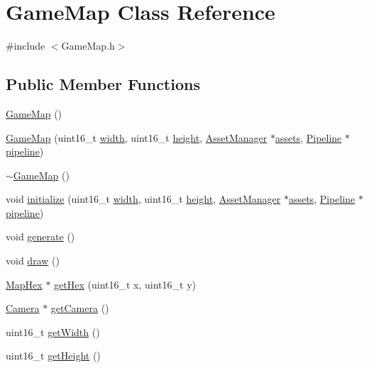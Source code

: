 \hypertarget{class_game_map}{}\section{Game\+Map Class Reference}
\label{class_game_map}


{\ttfamily \#include $<$Game\+Map.\+h$>$}

\subsection*{Public Member Functions}
\begin{DoxyCompactItemize}
\item 
\hyperlink{class_game_map_aae71e5694cf19612fcaa4c1e21b03b71}{Game\+Map} ()
\item 
\hyperlink{class_game_map_a4b0e78c26fc61ce3e8db947f37828a02}{Game\+Map} (uint16\+\_\+t \hyperlink{class_game_map_a827aedef06be5c3115eeea3ac8e68b72}{width}, uint16\+\_\+t \hyperlink{class_game_map_a37c9c83ab73f37508753f45cbc9594d5}{height}, \hyperlink{class_asset_manager}{Asset\+Manager} $\ast$\hyperlink{class_game_map_af63a6638804af038977a55f6e4d6d6bd}{assets}, \hyperlink{class_pipeline}{Pipeline} $\ast$\hyperlink{class_game_map_a0fd10cff6ef3c8b1b96eb7f3cabc8946}{pipeline})
\item 
\hyperlink{class_game_map_a85d51ef20c2d27f11c739ff02d5717c3}{$\sim$\+Game\+Map} ()
\item 
void \hyperlink{class_game_map_ad45871c8fe5b4de49862b433a787976f}{initialize} (uint16\+\_\+t \hyperlink{class_game_map_a827aedef06be5c3115eeea3ac8e68b72}{width}, uint16\+\_\+t \hyperlink{class_game_map_a37c9c83ab73f37508753f45cbc9594d5}{height}, \hyperlink{class_asset_manager}{Asset\+Manager} $\ast$\hyperlink{class_game_map_af63a6638804af038977a55f6e4d6d6bd}{assets}, \hyperlink{class_pipeline}{Pipeline} $\ast$\hyperlink{class_game_map_a0fd10cff6ef3c8b1b96eb7f3cabc8946}{pipeline})
\item 
void \hyperlink{class_game_map_a103d98c8ebfe9faee715dc5694523a20}{generate} ()
\item 
void \hyperlink{class_game_map_ae560711cdd8957dfe1d015cbd082b5d9}{draw} ()
\item 
\hyperlink{class_map_hex}{Map\+Hex} $\ast$ \hyperlink{class_game_map_a984e563131ecca57fefae279be891952}{get\+Hex} (uint16\+\_\+t x, uint16\+\_\+t y)
\item 
\hyperlink{class_camera}{Camera} $\ast$ \hyperlink{class_game_map_a99ea6c65c8da270ae6894cab6741a64e}{get\+Camera} ()
\item 
uint16\+\_\+t \hyperlink{class_game_map_a2d2b30e705de99d03e5b479ca38b6d91}{get\+Width} ()
\item 
uint16\+\_\+t \hyperlink{class_game_map_ad7d63a46103943b6dcb3772d22bf66e4}{get\+Height} ()
\end{DoxyCompactItemize}
